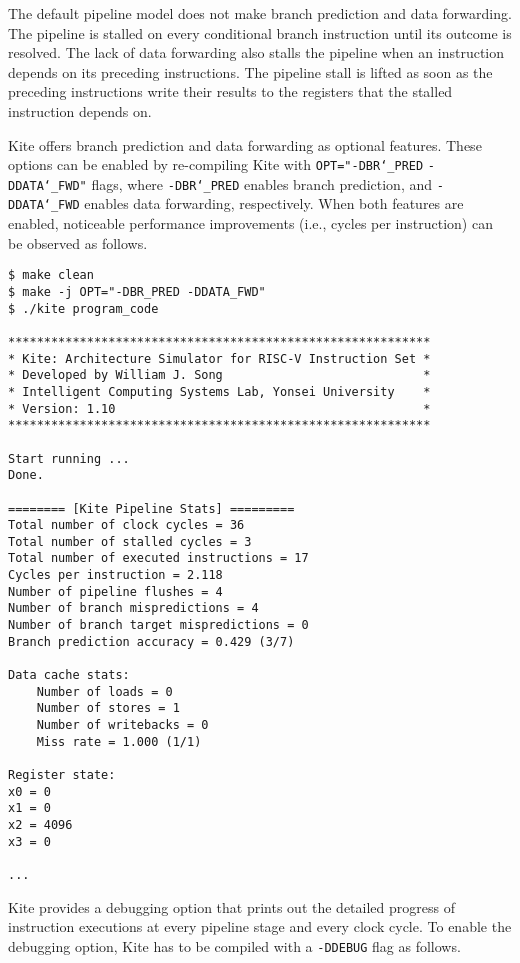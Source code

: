 \documentclass[10pt]{article}
\begin{document}
The default pipeline model does not make branch prediction and data forwarding.
The pipeline is stalled on every conditional branch instruction until its outcome is resolved.
The lack of data forwarding also stalls the pipeline when an instruction depends on its preceding instructions.
The pipeline stall is lifted as soon as the preceding instructions write their results to the registers that the stalled instruction depends on.

Kite offers branch prediction and data forwarding as optional features.
These options can be enabled by re-compiling Kite with {\tt OPT="-DBR\char`_PRED} {\tt -DDATA\char`_FWD"} flags, where {\tt -DBR\char`_PRED} enables branch prediction, and {\tt -DDATA\char`_FWD} enables data forwarding, respectively.
When both features are enabled, noticeable performance improvements (i.e., cycles per instruction) can be observed as follows.

\begin{Verbatim}[frame=single]
$ make clean
$ make -j OPT="-DBR_PRED -DDATA_FWD"
$ ./kite program_code

***********************************************************
* Kite: Architecture Simulator for RISC-V Instruction Set *
* Developed by William J. Song                            *
* Intelligent Computing Systems Lab, Yonsei University    *
* Version: 1.10                                           *
***********************************************************

Start running ...
Done.

======== [Kite Pipeline Stats] =========
Total number of clock cycles = 36
Total number of stalled cycles = 3
Total number of executed instructions = 17
Cycles per instruction = 2.118
Number of pipeline flushes = 4
Number of branch mispredictions = 4
Number of branch target mispredictions = 0
Branch prediction accuracy = 0.429 (3/7)

Data cache stats:
    Number of loads = 0
    Number of stores = 1
    Number of writebacks = 0
    Miss rate = 1.000 (1/1)

Register state:
x0 = 0
x1 = 0
x2 = 4096
x3 = 0

...

\end{Verbatim}

Kite provides a debugging option that prints out the detailed progress of instruction executions at every pipeline stage and every clock cycle.
To enable the debugging option, Kite has to be compiled with a {\tt -DDEBUG} flag as follows.
\end{document}

